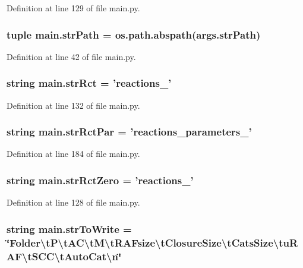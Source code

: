 Definition at line 129 of file main.\-py.

\hypertarget{a00151_ac0b5b603b5f89c10838ce6a42be8c6f7}{
\subsubsection[{str\-Path}]{\setlength{\rightskip}{0pt plus 5cm}tuple main.\-str\-Path = os.\-path.\-abspath(args.\-str\-Path)}}\label{a00151_ac0b5b603b5f89c10838ce6a42be8c6f7}


Definition at line 42 of file main.\-py.

\hypertarget{a00151_a28a37e653a4c0984df32f8d83c3596ff}{
\subsubsection[{str\-Rct}]{\setlength{\rightskip}{0pt plus 5cm}string main.\-str\-Rct = 'reactions\-\_\-'}}\label{a00151_a28a37e653a4c0984df32f8d83c3596ff}


Definition at line 132 of file main.\-py.

\hypertarget{a00151_af48af84bff2351a55727aba6a63c1b52}{
\subsubsection[{str\-Rct\-Par}]{\setlength{\rightskip}{0pt plus 5cm}string main.\-str\-Rct\-Par = 'reactions\-\_\-parameters\-\_\-'}}\label{a00151_af48af84bff2351a55727aba6a63c1b52}


Definition at line 184 of file main.\-py.

\hypertarget{a00151_adbfa32333003aa707723362b43bc11ff}{
\subsubsection[{str\-Rct\-Zero}]{\setlength{\rightskip}{0pt plus 5cm}string main.\-str\-Rct\-Zero = 'reactions\-\_\-'}}\label{a00151_adbfa32333003aa707723362b43bc11ff}


Definition at line 128 of file main.\-py.

\hypertarget{a00151_ab9980383a541b03ce91d6b812a4bf79a}{
\subsubsection[{str\-To\-Write}]{\setlength{\rightskip}{0pt plus 5cm}string main.\-str\-To\-Write = \char`\"{}Folder\textbackslash{}t\-P\textbackslash{}t\-A\-C\textbackslash{}t\-M\textbackslash{}t\-R\-A\-Fsize\textbackslash{}t\-Closure\-Size\textbackslash{}t\-Cats\-Size\textbackslash{}tu\-R\-A\-F\textbackslash{}t\-S\-C\-C\textbackslash{}t\-Auto\-Cat\textbackslash{}n\char`\"{}}}\label{a00151_ab9980383a541b03ce91d6b812a4bf79a}



